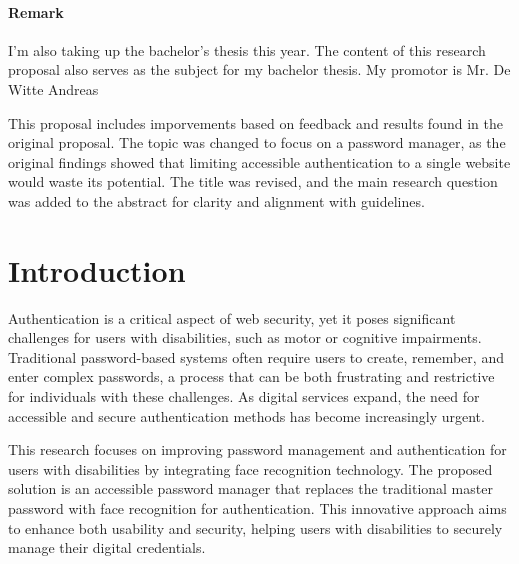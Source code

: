 



\bigskip

\vspace{2\baselineskip} %
\paragraph{Remark}

I'm also taking up the bachelor's thesis this year. The content of this research proposal also serves as the subject for my bachelor thesis. My promotor is Mr. De Witte Andreas

This proposal includes imporvements based on feedback and results found in the original proposal. The topic was changed to focus on a password manager, as the original findings showed that limiting accessible authentication to a single website would waste its potential. The title was revised, and the main research question was added to the abstract for clarity and alignment with guidelines.
\clearpage

\section{Introduction}%
\label{sec:Introduction}
Authentication is a critical aspect of web security, yet it poses significant challenges for users with disabilities, such as motor or cognitive impairments. Traditional password-based systems often require users to create, remember, and enter complex passwords, a process that can be both frustrating and restrictive for individuals with these challenges. As digital services expand, the need for accessible and secure authentication methods has become increasingly urgent.

This research focuses on improving password management and authentication for users with disabilities by integrating face recognition technology. The proposed solution is an accessible password manager that replaces the traditional master password with face recognition for authentication. This innovative approach aims to enhance both usability and security, helping users with disabilities to  securely manage their digital credentials.

